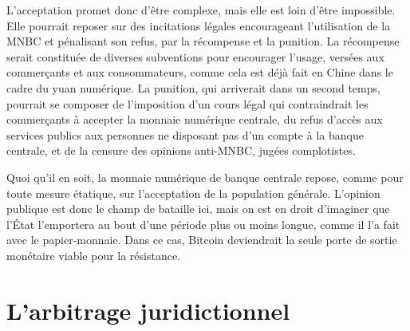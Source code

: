 L'acceptation promet donc d'être complexe, mais elle est loin d'être impossible. Elle pourrait reposer sur des incitations légales encourageant l'utilisation de la MNBC et pénalisant son refus, par la récompense et la punition. La récompense serait constituée de diverses subventions pour encourager l'usage, versées aux commerçants et aux consommateurs, comme cela est déjà fait en Chine dans le cadre du yuan numérique. La punition, qui arriverait dans un second temps, pourrait se composer de l'imposition d'un cours légal qui contraindrait les commerçants à accepter la monnaie numérique centrale, du refus d'accès aux services publics aux personnes ne disposant pas d'un compte à la banque centrale, et de la censure des opinions anti-MNBC, jugées complotistes. %

Quoi qu'il en soit, la monnaie numérique de banque centrale repose, comme pour toute mesure étatique, sur l'acceptation de la population générale. L'opinion publique est donc le champ de bataille ici, mais on est en droit d'imaginer que l'État l'emportera au bout d'une période plus ou moins longue, comme il l'a fait avec le papier-monnaie. Dans ce cas, Bitcoin deviendrait la seule porte de sortie monétaire viable pour la résistance.



\section*{L'arbitrage juridictionnel}

